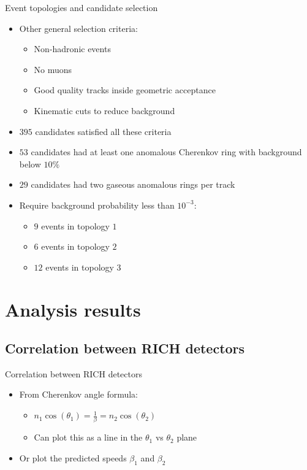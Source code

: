 \documentclass{beamer}
\begin{document}
\begin{frame}{Event topologies and candidate selection}
  \begin{itemize}
    \item{Other general selection criteria:}
    \begin{itemize}
      \item{Non-hadronic events}
      \item{No muons}
      \item{Good quality tracks inside geometric acceptance}
      \item{Kinematic cuts to reduce background}
    \end{itemize}
    \item{$395$ candidates satisfied all these criteria}
    \item{$53$ candidates had at least one anomalous Cherenkov ring with background below $10\%$}
    \item{$29$ candidates had two gaseous anomalous rings per track}
    \item{Require background probability less than $10^{-3}$:}
    \begin{itemize}
      \item{$9$ events in topology $1$}
      \item{$6$ events in topology $2$}
      \item{$12$ events in topology $3$}
    \end{itemize}
  \end{itemize}
\end{frame}

\section{Analysis results}
\subsection{Correlation between RICH detectors}
\begin{frame}{Correlation between RICH detectors}
  \begin{itemize}
    \item{From Cherenkov angle formula:}
    \begin{itemize}
      \item{$n_1\cos(\theta_1) = \frac{1}{\beta} = n_2\cos(\theta_2)$}
      \item{Can plot this as a line in the $\theta_1$ vs $\theta_2$ plane}
    \end{itemize}
    \item{Or plot the predicted speeds $\beta_1$ and $\beta_2$}
  \end{itemize}
\end{frame}
\end{document}
